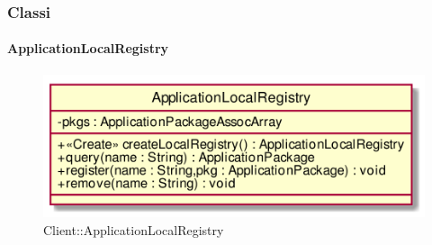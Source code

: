 \subsubsection{Classi}
\hypertarget{ApplicationLocalRegistry_label}{\paragraph{ApplicationLocalRegistry}}
\begin{figure}[h]
	\centering
	\includegraphics[width=\textwidth,height=\textheight,keepaspectratio]{images/ClassApplicationLocalRegistry.png}
	\caption{Client::ApplicationLocalRegistry}
\end{figure}

